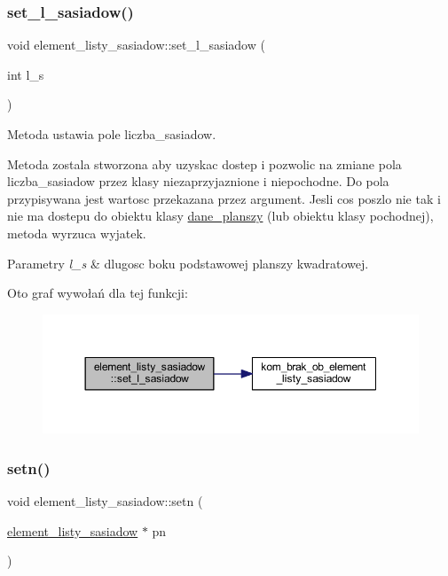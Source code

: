 \subsubsection{\texorpdfstring{set\+\_\+l\+\_\+sasiadow()}{set\_l\_sasiadow()}}
{\footnotesize\ttfamily void element\+\_\+listy\+\_\+sasiadow\+::set\+\_\+l\+\_\+sasiadow (\begin{DoxyParamCaption}\item[{int}]{l\+\_\+s }\end{DoxyParamCaption})}

Metoda ustawia pole liczba\+\_\+sasiadow.

Metoda zostala stworzona aby uzyskac dostep i pozwolic na zmiane pola liczba\+\_\+sasiadow przez klasy niezaprzyjaznione i niepochodne. Do pola przypisywana jest wartosc przekazana przez argument. Jesli cos poszlo nie tak i nie ma dostepu do obiektu klasy \mbox{\hyperlink{classdane__planszy}{dane\+\_\+planszy}} (lub obiektu klasy pochodnej), metoda wyrzuca wyjatek. 
\begin{DoxyParams}{Parametry}
{\em l\+\_\+s} & dlugosc boku podstawowej planszy kwadratowej. \\
\hline
\end{DoxyParams}
Oto graf wywołań dla tej funkcji\+:
\nopagebreak
\begin{figure}[H]
\begin{center}
\leavevmode
\includegraphics[width=350pt]{classelement__listy__sasiadow_a98ac4971a69b17a96fb7689abb5e1b58_cgraph}
\end{center}
\end{figure}
\mbox{\label{classelement__listy__sasiadow_a13c6144a9053a0c8ba1aac2a3ca8a575}} 
\subsubsection{\texorpdfstring{setn()}{setn()}}
{\footnotesize\ttfamily void element\+\_\+listy\+\_\+sasiadow\+::setn (\begin{DoxyParamCaption}\item[{\mbox{\hyperlink{classelement__listy__sasiadow}{element\+\_\+listy\+\_\+sasiadow}} $\ast$}]{pn }\end{DoxyParamCaption})}

